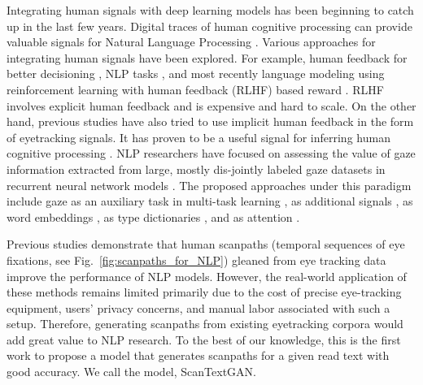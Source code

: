 Integrating human signals with deep learning models has been beginning to catch up in the last few years. Digital traces of human cognitive processing can provide valuable signals for Natural Language Processing \cite{klerke2016improving,plank-2016-keystroke}. Various approaches for integrating human signals have been explored. For example, human feedback for better decisioning \citep{christiano2017deep}, NLP tasks \citep{stiennon2020learning,wu2021recursively}, and most recently language modeling using reinforcement learning with human feedback (RLHF) based reward \citep{bai2022training,ouyang2022training}. RLHF involves explicit human feedback and is expensive and hard to scale. On the other hand, previous studies have also tried to use implicit human feedback in the form of eyetracking signals.
It has proven to be a useful signal for inferring human cognitive processing \cite{sood2020improving, hollenstein-zhang-2019-entity, ijcaiSurveyGapIdentified}. NLP researchers have focused on assessing the value of gaze information extracted from large, mostly dis-jointly labeled gaze datasets in recurrent neural network models \cite{ren-xiong-2021-cogalign,strzyz-etal-2019-towards,barrett-etal-2018-sequence}. The proposed approaches under this paradigm include gaze as an auxiliary task in multi-task learning \cite{klerke-etal-2016-improving,hollenstein2019advancing}, as additional signals \cite{mishra-etal-2016-harnessing}, as word embeddings \cite{barrett-etal-2018-unsupervised}, as type dictionaries \cite{barrett-etal-2016-weakly,hollenstein-zhang-2019-entity}, and
as attention \cite{barrett-etal-2018-sequence}. 

Previous studies demonstrate that human scanpaths (temporal sequences of eye fixations, see Fig.~\ref{fig:scanpaths_for_NLP}) gleaned from eye tracking data improve the performance of NLP models. However, the real-world application of these methods remains limited primarily due to the cost of precise eye-tracking equipment, users' privacy concerns, and manual labor associated with such a setup. Therefore, generating scanpaths from existing eyetracking corpora would add great value to NLP research. To the best of our knowledge, this is the first work to propose a model that generates scanpaths for a given read text with good accuracy. We call the model, ScanTextGAN.

